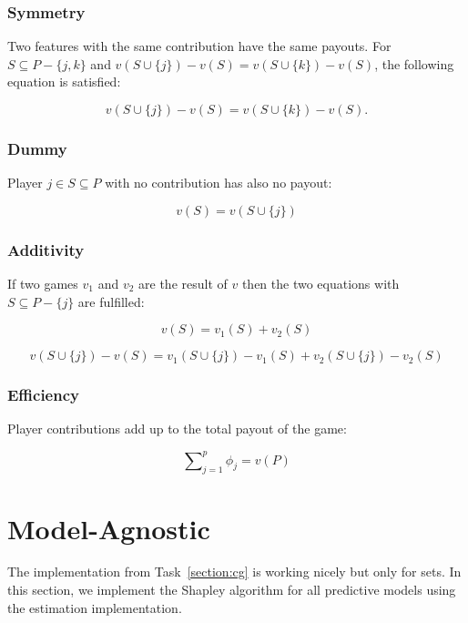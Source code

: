 \documentclass[a4paper]{article}
\begin{document}
\subsubsection{Symmetry} Two features with the same contribution have the same payouts. For $S \subseteq P - \{j,k\}$ and $v(S \cup \{j\}) -  v(S) = v(S \cup \{k\}) -  v(S)$, the following equation is satisfied:

\begin{equation}
    v(S \cup \{j\}) - v(S) = v(S \cup \{k\}) -  v(S).
\end{equation}


\subsubsection{Dummy} Player $j \in S  \subseteq P$ with no contribution has also no payout:

\begin{equation}
    v(S) = v(S \cup \{j\})
\end{equation}

\subsubsection{Additivity} If two games $v_1$ and $v_2$ are the result of $v$ then the two equations with $S \subseteq P - \{j\}$ are fulfilled:

\begin{equation}
    v(S) = v_1(S) + v_2(S)
\end{equation}

\begin{equation}
v(S \cup \{j\}) - v(S) = v_1(S \cup \{j\}) - v_1(S) + v_2(S \cup \{j\}) - v_2(S)
\end{equation}


\subsubsection{Efficiency} Player contributions add up to the total payout of the game:

\begin{equation}
    \sum\nolimits_{j=1}^p\phi_j = v(P)
\end{equation}


\section{Model-Agnostic}

The implementation from Task~\ref{section:cg} is working nicely but only for sets. In this section, we implement the Shapley algorithm for all predictive models using the estimation implementation.
\end{document}
